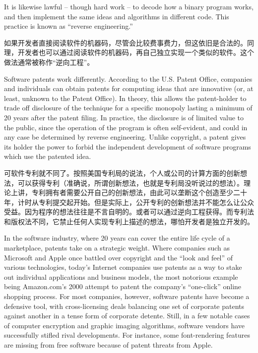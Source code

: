\ifdefined\eng
It is likewise lawful -- though hard work -- to decode how a binary program works, and then implement the same ideas and algorithms in different code.  This practice is known as ``reverse engineering.''
\fi

\ifdefined\chs
如果开发者直接阅读软件的机器码，尽管会比较费事费力，但这依旧是合法的。同理，开发者也可以通过阅读软件的机器码，再自己独立实现一个类似的软件。这个做法通常被称作“逆向工程”。
\fi

\ifdefined\eng
Software patents work differently. According to the U.S. Patent Office, companies and individuals can obtain patents for computing ideas that are innovative (or, at least, unknown to the Patent Office). In theory, this allows the patent-holder to trade off disclosure of the technique for a specific monopoly lasting a minimum of 20 years after the patent filing. In practice, the disclosure is of limited value to the public, since the operation of the program is often self-evident, and could in any case be determined by reverse engineering. Unlike copyright, a patent gives its holder the power to forbid the independent development of software programs which use the patented idea.
\fi

\ifdefined\chs
可软件专利就不同了。按照美国专利局的说法，个人或公司的计算方面的创新想法，可以获得专利（准确说，所谓创新想法，也就是专利局没听说过的想法）。理论上讲，专利拥有者需要公开自己的创新想法，由此可以垄断这个创造至少二十年，计时从专利提交起开始。但是实际上，公开专利的创新想法并不能怎么让公众受益。因为程序的想法往往是不言自明的。或者可以通过逆向工程获得。而专利法和版权法不同，它禁止任何人实现专利上描述的想法，哪怕开发者是独立开发的。
\fi

\ifdefined\eng
In the software industry, where 20 years can cover the entire life cycle of a marketplace, patents take on a strategic weight. Where companies such as Microsoft and Apple once battled over copyright and the ``look and feel'' of various technologies, today's Internet companies use patents as a way to stake out individual applications and business models, the most notorious example being Amazon.com's 2000 attempt to patent the company's ``one-click'' online shopping process. For most companies, however, software patents have become a defensive tool, with cross-licensing deals balancing one set of corporate patents against another in a tense form of corporate detente. Still, in a few notable cases of computer encryption and graphic imaging algorithms, software vendors have successfully stifled rival developments.  For instance, some font-rendering features are missing from free software because of patent threats from Apple.
\fi

